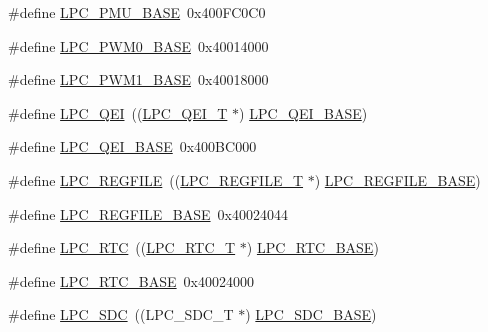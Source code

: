 \begin{DoxyCompactItemize}
\item 
\#define \hyperlink{group__PERIPH__177X__8X__BASE_ga865bed8ad61e9e273439ad1349a46d68}{L\+P\+C\+\_\+\+P\+M\+U\+\_\+\+B\+A\+SE}~0x400\+F\+C0\+C0
\item 
\#define \hyperlink{group__PERIPH__177X__8X__BASE_gad2e9bbd8d91b559eed11b8e83bd73bbf}{L\+P\+C\+\_\+\+P\+W\+M0\+\_\+\+B\+A\+SE}~0x40014000
\item 
\#define \hyperlink{group__PERIPH__177X__8X__BASE_gabb885bd92b4a003b94dc27c4700818bb}{L\+P\+C\+\_\+\+P\+W\+M1\+\_\+\+B\+A\+SE}~0x40018000
\item 
\#define \hyperlink{group__PERIPH__177X__8X__BASE_ga71347b58898f54f8e9f00a6c652c7d49}{L\+P\+C\+\_\+\+Q\+EI}~((\hyperlink{structLPC__QEI__T}{L\+P\+C\+\_\+\+Q\+E\+I\+\_\+T}              $\ast$) \hyperlink{group__PERIPH__407X__8X__BASE_ga80fa25b18324c10c8e5c26893e6f0a67}{L\+P\+C\+\_\+\+Q\+E\+I\+\_\+\+B\+A\+SE})
\item 
\#define \hyperlink{group__PERIPH__177X__8X__BASE_ga80fa25b18324c10c8e5c26893e6f0a67}{L\+P\+C\+\_\+\+Q\+E\+I\+\_\+\+B\+A\+SE}~0x400\+B\+C000
\item 
\#define \hyperlink{group__PERIPH__177X__8X__BASE_ga2c74da31b7fd461d9b01e3241963f895}{L\+P\+C\+\_\+\+R\+E\+G\+F\+I\+LE}~((\hyperlink{structLPC__REGFILE__T}{L\+P\+C\+\_\+\+R\+E\+G\+F\+I\+L\+E\+\_\+T}          $\ast$) \hyperlink{group__PERIPH__407X__8X__BASE_gad2674eff10cea9243ab060ad1fbac9d2}{L\+P\+C\+\_\+\+R\+E\+G\+F\+I\+L\+E\+\_\+\+B\+A\+SE})
\item 
\#define \hyperlink{group__PERIPH__177X__8X__BASE_gad2674eff10cea9243ab060ad1fbac9d2}{L\+P\+C\+\_\+\+R\+E\+G\+F\+I\+L\+E\+\_\+\+B\+A\+SE}~0x40024044
\item 
\#define \hyperlink{group__PERIPH__177X__8X__BASE_ga8303d3e5135b2a039f0dc5f93c194f78}{L\+P\+C\+\_\+\+R\+TC}~((\hyperlink{structLPC__RTC__T}{L\+P\+C\+\_\+\+R\+T\+C\+\_\+T}              $\ast$) \hyperlink{group__PERIPH__407X__8X__BASE_ga4618213cf968f8245814d7d3e7aa2e2e}{L\+P\+C\+\_\+\+R\+T\+C\+\_\+\+B\+A\+SE})
\item 
\#define \hyperlink{group__PERIPH__177X__8X__BASE_ga4618213cf968f8245814d7d3e7aa2e2e}{L\+P\+C\+\_\+\+R\+T\+C\+\_\+\+B\+A\+SE}~0x40024000
\item 
\#define \hyperlink{group__PERIPH__177X__8X__BASE_ga3914f06f63d5e9e9156865b86956bca8}{L\+P\+C\+\_\+\+S\+DC}~((L\+P\+C\+\_\+\+S\+D\+C\+\_\+T              $\ast$) \hyperlink{group__PERIPH__407X__8X__BASE_gab8f044e5911a6bf51879e4614bf2a0a3}{L\+P\+C\+\_\+\+S\+D\+C\+\_\+\+B\+A\+SE})
\item 

\end{DoxyCompactItemize}
